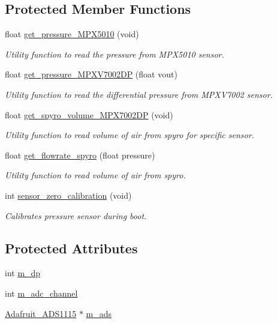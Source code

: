 \subsection*{Protected Member Functions}
\begin{DoxyCompactItemize}
\item 
float \hyperlink{group___ventilator_module_ga5f113f838045ef7cd582cebfcd00c4f0}{get\+\_\+pressure\+\_\+\+M\+P\+X5010} (void)
\begin{DoxyCompactList}\small\item\em Utility function to read the pressure from M\+P\+X5010 sensor. \end{DoxyCompactList}\item 
float \hyperlink{group___ventilator_module_ga5eb61c5fdc62a4a0b494a518fc7273ba}{get\+\_\+pressure\+\_\+\+M\+P\+X\+V7002\+DP} (float vout)
\begin{DoxyCompactList}\small\item\em Utility function to read the differential pressure from M\+P\+X\+V7002 sensor. \end{DoxyCompactList}\item 
float \hyperlink{group___ventilator_module_gab51f616f215d3b4ade2bdd9a3958622d}{get\+\_\+spyro\+\_\+volume\+\_\+\+M\+P\+X7002\+DP} (void)
\begin{DoxyCompactList}\small\item\em Utility function to read volume of air from spyro for specific sensor. \end{DoxyCompactList}\item 
float \hyperlink{group___ventilator_module_ga4a650b2c4cb1b55f8be3a4c129d4f12a}{get\+\_\+flowrate\+\_\+spyro} (float pressure)
\begin{DoxyCompactList}\small\item\em Utility function to read volume of air from spyro. \end{DoxyCompactList}\item 
int \hyperlink{group___ventilator_module_gafd69d3a07ff97d3b68bd952d5286b11a}{sensor\+\_\+zero\+\_\+calibration} (void)
\begin{DoxyCompactList}\small\item\em Calibrates pressure sensor during boot. \end{DoxyCompactList}\end{DoxyCompactItemize}
\subsection*{Protected Attributes}
\begin{DoxyCompactItemize}
\item 
int \hyperlink{classpressure__sensor_a10d72913265c157d3c0f0fbbceb937e7}{m\+\_\+dp}
\item 
int \hyperlink{classpressure__sensor_a8dcf68ecb088159c4cd9f390ff6e556d}{m\+\_\+adc\+\_\+channel}
\item 
\hyperlink{class_adafruit___a_d_s1115}{Adafruit\+\_\+\+A\+D\+S1115} $\ast$ \hyperlink{classpressure__sensor_ac07bb98b1f166cff5d144f9c4abfe0ae}{m\+\_\+ads}
\end{DoxyCompactItemize}

